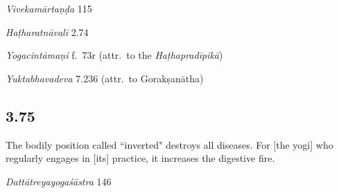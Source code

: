\begin{ekdosis}
\begin{sources}[hp03_074]
\emph{Vivekamārtaṇḍa} 115
\begin{versinnote}
\end{versinnote}
\end{sources}

\begin{testimonia}[hp03_074]
\emph{Haṭharatnāvalī} 2.74
\begin{versinnote}
\end{versinnote}

\emph{Yogacintāmaṇi} f.~73r (attr.~to the \emph{Haṭhapradīpikā})
\begin{versinnote}
\end{versinnote}

\emph{Yuktabhavadeva} 7.236 (attr.~to Gorakṣanātha)
\begin{versinnote}
\end{versinnote}
\end{testimonia}



\subsection*{3.75}
\begin{translation}[hp03_075]
The bodily position called “inverted" destroys all diseases. For [the yogi] who regularly engages in [its] practice, it increases the digestive fire.
\end{translation}

\begin{sources}[hp03_075]
\emph{Dattātreyayogaśāstra} 146
\begin{versinnote}
\end{versinnote}
\end{sources}


\end{ekdosis}
